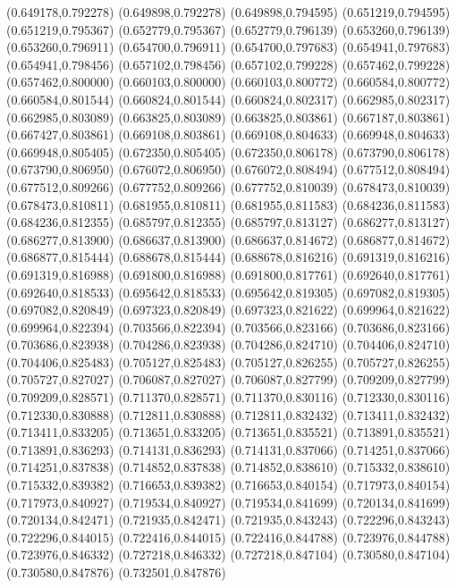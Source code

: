 (0.649178,0.792278)
(0.649898,0.792278)
(0.649898,0.794595)
(0.651219,0.794595)
(0.651219,0.795367)
(0.652779,0.795367)
(0.652779,0.796139)
(0.653260,0.796139)
(0.653260,0.796911)
(0.654700,0.796911)
(0.654700,0.797683)
(0.654941,0.797683)
(0.654941,0.798456)
(0.657102,0.798456)
(0.657102,0.799228)
(0.657462,0.799228)
(0.657462,0.800000)
(0.660103,0.800000)
(0.660103,0.800772)
(0.660584,0.800772)
(0.660584,0.801544)
(0.660824,0.801544)
(0.660824,0.802317)
(0.662985,0.802317)
(0.662985,0.803089)
(0.663825,0.803089)
(0.663825,0.803861)
(0.667187,0.803861)
(0.667427,0.803861)
(0.669108,0.803861)
(0.669108,0.804633)
(0.669948,0.804633)
(0.669948,0.805405)
(0.672350,0.805405)
(0.672350,0.806178)
(0.673790,0.806178)
(0.673790,0.806950)
(0.676072,0.806950)
(0.676072,0.808494)
(0.677512,0.808494)
(0.677512,0.809266)
(0.677752,0.809266)
(0.677752,0.810039)
(0.678473,0.810039)
(0.678473,0.810811)
(0.681955,0.810811)
(0.681955,0.811583)
(0.684236,0.811583)
(0.684236,0.812355)
(0.685797,0.812355)
(0.685797,0.813127)
(0.686277,0.813127)
(0.686277,0.813900)
(0.686637,0.813900)
(0.686637,0.814672)
(0.686877,0.814672)
(0.686877,0.815444)
(0.688678,0.815444)
(0.688678,0.816216)
(0.691319,0.816216)
(0.691319,0.816988)
(0.691800,0.816988)
(0.691800,0.817761)
(0.692640,0.817761)
(0.692640,0.818533)
(0.695642,0.818533)
(0.695642,0.819305)
(0.697082,0.819305)
(0.697082,0.820849)
(0.697323,0.820849)
(0.697323,0.821622)
(0.699964,0.821622)
(0.699964,0.822394)
(0.703566,0.822394)
(0.703566,0.823166)
(0.703686,0.823166)
(0.703686,0.823938)
(0.704286,0.823938)
(0.704286,0.824710)
(0.704406,0.824710)
(0.704406,0.825483)
(0.705127,0.825483)
(0.705127,0.826255)
(0.705727,0.826255)
(0.705727,0.827027)
(0.706087,0.827027)
(0.706087,0.827799)
(0.709209,0.827799)
(0.709209,0.828571)
(0.711370,0.828571)
(0.711370,0.830116)
(0.712330,0.830116)
(0.712330,0.830888)
(0.712811,0.830888)
(0.712811,0.832432)
(0.713411,0.832432)
(0.713411,0.833205)
(0.713651,0.833205)
(0.713651,0.835521)
(0.713891,0.835521)
(0.713891,0.836293)
(0.714131,0.836293)
(0.714131,0.837066)
(0.714251,0.837066)
(0.714251,0.837838)
(0.714852,0.837838)
(0.714852,0.838610)
(0.715332,0.838610)
(0.715332,0.839382)
(0.716653,0.839382)
(0.716653,0.840154)
(0.717973,0.840154)
(0.717973,0.840927)
(0.719534,0.840927)
(0.719534,0.841699)
(0.720134,0.841699)
(0.720134,0.842471)
(0.721935,0.842471)
(0.721935,0.843243)
(0.722296,0.843243)
(0.722296,0.844015)
(0.722416,0.844015)
(0.722416,0.844788)
(0.723976,0.844788)
(0.723976,0.846332)
(0.727218,0.846332)
(0.727218,0.847104)
(0.730580,0.847104)
(0.730580,0.847876)
(0.732501,0.847876)
